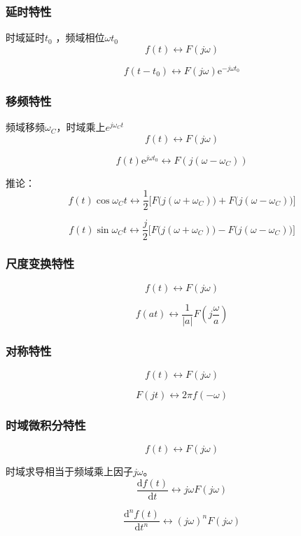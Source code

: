 \documentclass[UTF8]{ctexart}
\begin{document}
\subsubsection{延时特性}

时域延时$t_0$ ，频域相位$ωt_0$
$$
f(t)\leftrightarrow F(j\omega)
$$

$$
f(t-t_0)\leftrightarrow F(j\omega)\mathrm{e}^{-j\omega t_0}
$$

\subsubsection{移频特性}

频域移频$ω_C$，时域乘上$e^{jω_Ct}$
$$
f(t)\leftrightarrow F(j\omega)
$$

$$
f(t)\mathrm{e}^{j\omega t_0}\leftrightarrow F(j(\omega-\omega_C))
$$

推论：
$$
f(t)\cos\omega_C t \longleftrightarrow \frac{1}{2}\Big[F\big(j(\omega+\omega_C)\big)+F\big(j(\omega-\omega_C)\big)\Big]
$$

$$
f(t)\sin\omega_C t \longleftrightarrow \frac{j}{2}\Big[F\big(j(\omega+\omega_C)\big)-F\big(j(\omega-\omega_C)\big)\Big]
$$

\subsubsection{尺度变换特性}

$$
f(t) \leftrightarrow F(j\omega)
$$

$$
f(at) \leftrightarrow \frac{1}{|a|} F\left( j\frac{\omega}{a} \right)
$$

\subsubsection{对称特性}

$$
f(t) \leftrightarrow F(j\omega)
$$

$$
F(jt) \leftrightarrow 2\pi f(-\omega)
$$

\subsubsection{时域微积分特性}

$$
f(t) \leftrightarrow F(j\omega)
$$

时域求导相当于频域乘上因子$jω$。
$$
\frac{\mathrm{d}f(t)}{\mathrm{d}t} \leftrightarrow j\omega F(j\omega)
$$

$$
\frac{\mathrm{d}^n f(t)}{\mathrm{d}t^n} \leftrightarrow (j\omega)^n F(j\omega)
$$
\end{document}
